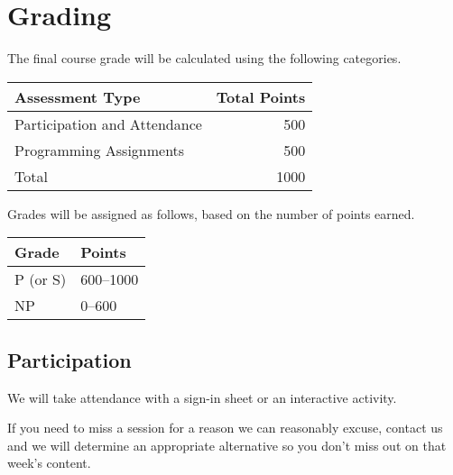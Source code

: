 \documentclass{article}
\begin{document}
\section*{Grading}

The final course grade will be calculated using the following categories. 

\begin{center}
    \begin{tabular}{@{}lr@{}}
        Assessment Type                 & Total Points \\ \toprule
        Participation and Attendance    &          500 \\
        Programming Assignments         &          500 \\ \midrule
        Total                           &         1000 \\ \bottomrule
    \end{tabular}
\end{center}

Grades will be assigned as follows, based on the number of points earned.

\begin{center}
    \begin{tabular}{@{}ll@{}}
        Grade    & Points    \\ \toprule
        P (or S) & 600--1000 \\
        NP       & 0--600    \\ \bottomrule
    \end{tabular}
\end{center}


\subsection*{Participation}

We will take attendance with a sign-in sheet or an interactive activity.

If you need to miss a session for a reason we can reasonably excuse, contact us
and we will determine an appropriate alternative so you don't miss out on that
week's content.


\clearpage

\end{document}
